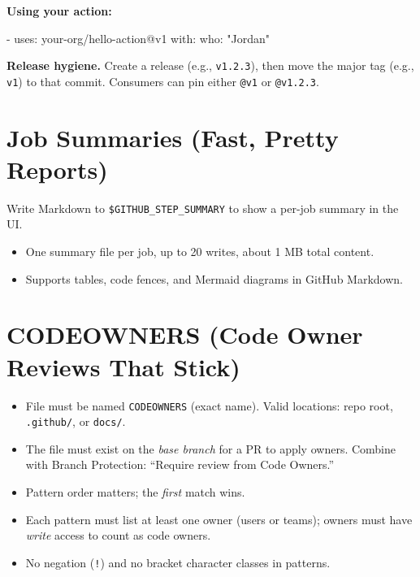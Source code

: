 \documentclass[11pt]{article}
\begin{document}
\noindent\textbf{Using your action:}
\begin{yamlcode}
- uses: your-org/hello-action@v1
  with:
    who: "Jordan"
\end{yamlcode}

\begin{tcolorbox}
\textbf{Release hygiene.} Create a release (e.g., \texttt{v1.2.3}), then move the major tag (e.g., \texttt{v1}) to that commit. Consumers can pin either \texttt{@v1} or \texttt{@v1.2.3}.
\end{tcolorbox}

\section{Job Summaries (Fast, Pretty Reports)}
Write Markdown to \texttt{\$GITHUB\_STEP\_SUMMARY} to show a per-job summary in the UI.
\begin{itemize}
  \item One summary file per job, up to 20 writes, about 1 MB total content.
  \item Supports tables, code fences, and Mermaid diagrams in GitHub Markdown.
\end{itemize}


\section{CODEOWNERS (Code Owner Reviews That Stick)}
\begin{itemize}
  \item File must be named \texttt{CODEOWNERS} (exact name). Valid locations: repo root, \texttt{.github/}, or \texttt{docs/}.
  \item The file must exist on the \emph{base branch} for a PR to apply owners. Combine with Branch Protection: ``Require review from Code Owners.''
  \item Pattern order matters; the \emph{first} match wins.
  \item Each pattern must list at least one owner (users or teams); owners must have \emph{write} access to count as code owners.
  \item No negation (\texttt{!}) and no bracket character classes in patterns.
\end{itemize}
\end{document}
